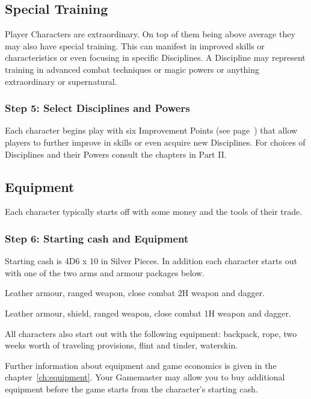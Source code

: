 \subsection{Special Training}
Player Characters are extraordinary. On top of them being above average they may also have special training. This can manifest in improved skills or characteristics or even focusing in specific Disciplines. A Discipline may represent training in advanced combat techniques or magic powers or anything extraordinary or supernatural.


\subsubsection{Step 5: Select Disciplines and Powers}
Each character begins play with six Improvement Points (see page~\pageref{ssec:improvement-points}) that allow players to further improve in skills or even acquire new Disciplines. For choices of Disciplines and their Powers consult the chapters in Part II.

\subsection{Equipment}
Each character typically starts off with some money and the tools of their trade.

\subsubsection{Step 6: Starting cash and Equipment}
Starting cash is 4D6 x 10 in Silver Pieces. In addition each character starts out with one of the two arms and armour packages below.

\begin{rpg-list}
	\item Leather armour, ranged weapon, close combat 2H weapon and dagger. 
	\item Leather armour, shield, ranged weapon, close combat 1H weapon and dagger.
\end{rpg-list}

All characters also start out with the following equipment: backpack, rope, two weeks worth of traveling provisions, flint and tinder, waterskin.

Further information about equipment and game economics is given in the chapter~\ref{ch:equipment}. Your Gamemaster may allow you to buy additional equipment before the game starts from the character’s starting cash.

